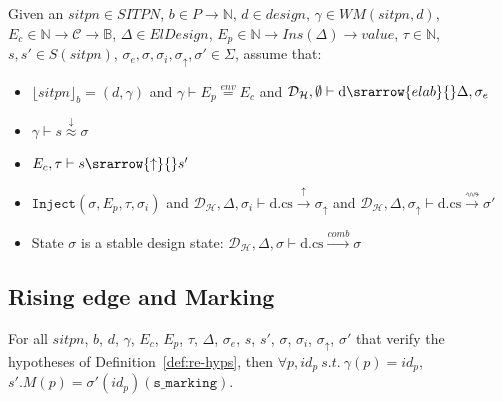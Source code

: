 \documentclass[dvipsnames,12pt]{article}
\begin{document}
\begin{definition}
  \label{def:re-hyps}
  Given an $sitpn\in{}SITPN$, $b\in{}P\rightarrow\mathbb{N}$,
  $d\in{}design$, $\gamma\in{}WM(sitpn,d)$,
  $E_c\in\mathbb{N}\rightarrow\mathcal{C}\rightarrow\mathbb{B}$,
  $\Delta\in{}ElDesign$,
  $E_p\in\mathbb{N}\rightarrow{}Ins(\Delta)\rightarrow{}value$,
  $\tau\in\mathbb{N}$, $s,s'\in{}S(sitpn)$,
  $\sigma_e,\sigma,\sigma_i,\sigma_\uparrow,\sigma'\in\Sigma$, assume
  that:
  \begin{itemize}
  \item $\lfloor{}sitpn\rfloor_b=(d,\gamma)$ and
    $\gamma\vdash{}E_p\stackrel{env}{=}E_c$ and
    $\mathcal{D}_\mathcal{H},\emptyset\vdash\mathrm{d}\srarrow{elab}{\fontsize{7}{7}\selectfont}\Delta,\sigma_e$
  \item $\gamma\vdash{}s\stackrel{\downarrow}{\approx}\sigma$
  \item
    $E_c,\tau\vdash{}s\srarrow{\uparrow}{\fontsize{7}{7}\selectfont}s'$
  \item $\mathtt{Inject}(\sigma, E_p, \tau, \sigma_i)$ and
    $\mathcal{D}_{\mathcal{H}},\Delta,\sigma_i\vdash\mathrm{d.cs}\xrightarrow{\uparrow}\sigma_\uparrow$
    and
    $\mathcal{D}_{\mathcal{H}},\Delta,\sigma_\uparrow\vdash\mathrm{d.cs}\xrightarrow{\rightsquigarrow}\sigma'$
  \item State $\sigma$ is a stable design state:
    $\mathcal{D}_{\mathcal{H}},\Delta,\sigma\vdash\mathrm{d.cs}\xrightarrow{comb}\sigma$
  \end{itemize}
\end{definition}

\def\rehyps{For all $sitpn$, $b$, $d$, $\gamma$, $E_c$, $E_p$, $\tau$,
  $\Delta$, $\sigma_e$, $s$, $s'$, $\sigma$, $\sigma_i$,
  $\sigma_\uparrow$, $\sigma'$ that verify the hypotheses of
  Definition~\ref{def:re-hyps},}

\subsection{Rising edge and Marking}
\label{sec:re-marking}


\begin{lemma}
  \label{lem:re-equal-marking}
  \rehyps{} then $\forall{}p,id_p~s.t.~\gamma(p)=id_p$,
  $s'.M(p)=\sigma'(id_p)(\texttt{s\_marking})$.
\end{lemma}
\end{document}
